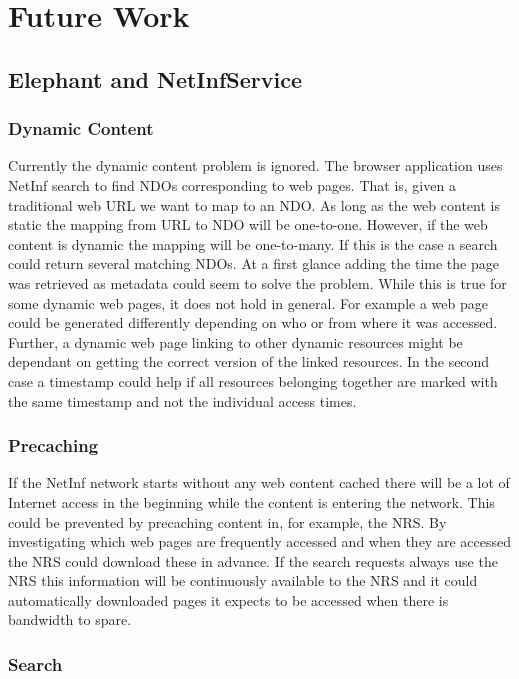 \section{Future Work}

\subsection{Elephant and NetInfService}

\subsubsection{Dynamic Content}

Currently the dynamic content problem is ignored. The browser application uses NetInf search to find NDOs corresponding to web pages. That is, given a traditional web URL we want to map to an NDO. As long as the web content is static the mapping from URL to NDO will be one-to-one. However, if the web content is dynamic the mapping will be one-to-many. If this is the case a search could return several matching NDOs. At a first glance adding the time the page was retrieved as metadata could seem to solve the problem. While this is true for some dynamic web pages, it does not hold in general. For example a web page could be generated differently depending on who or from where it was accessed. Further, a dynamic web page linking to other dynamic resources might be dependant on getting the correct version of the linked resources. In the second case a timestamp could help if all resources belonging together are marked with the same timestamp and not the individual access times.

\subsubsection{Precaching}

If the NetInf network starts without any web content cached there will be a lot of Internet access in the beginning while the content is entering the network. This could be prevented by precaching content in, for example, the NRS. By investigating which web pages are frequently accessed and when they are accessed the NRS could download these in advance. If the search requests always use the NRS this information will be continuously available to the NRS and it could automatically downloaded pages it expects to be accessed when there is bandwidth to spare.

\subsubsection{Search}

